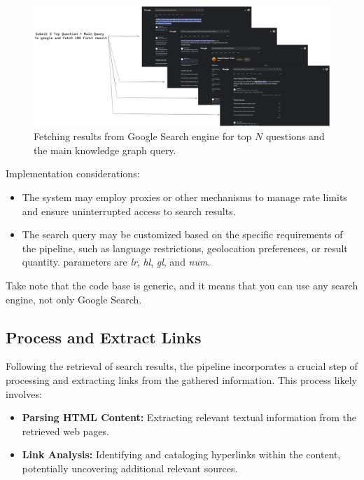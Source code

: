 \begin{figure}[ht!]
    \centering
    \begin{minipage}[b]{\textwidth}
        \centering
        \includegraphics[width=\textwidth]{res/Google-Search-Result}
    \end{minipage}
    \caption{Fetching results from Google Search engine for top $N$ questions and the main knowledge graph query.}
    \label{fig:google-search-result}
\end{figure}

Implementation considerations:
\begin{itemize}
    \item The system may employ proxies or other mechanisms to manage rate limits and ensure uninterrupted access to search results.
    \item The search query may be customized based on the specific requirements of the pipeline, such as language restrictions, geolocation preferences, or result quantity. parameters are \textit{lr}, \textit{hl}, \textit{gl}, and \textit{num}.
\end{itemize}

Take note that the code base is generic, and it means that you can use any search engine, not only Google Search.

\subsection{Process and Extract Links}\label{subsec:process-and-extract-links}
Following the retrieval of search results, the pipeline incorporates a crucial step of processing and extracting links from the gathered information.
This process likely involves:
\begin{itemize}
    \item \textbf{Parsing \ac{HTML} Content:} Extracting relevant textual information from the retrieved web pages.
    \item \textbf{Link Analysis:} Identifying and cataloging hyperlinks within the content, potentially uncovering additional relevant sources.
\end{itemize}

